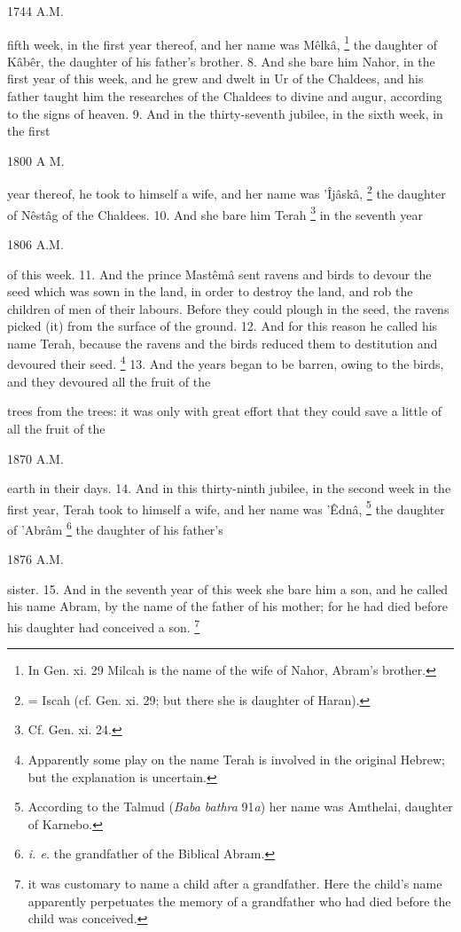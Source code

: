 1744 A.M.

fifth week, in the first year thereof, and her name was Mêlkâ, \footnote{In Gen. xi. 29 Milcah is the name of the wife of Nahor, Abram's brother.} the daughter of Kâbêr, the daughter of his father's brother. 8. And she bare him Nahor, in the first year of this week, and he grew and dwelt in Ur of the Chaldees, and his father taught him the researches of the Chaldees to divine and augur, according to the signs of heaven. 9. And in the thirty-seventh jubilee, in the sixth week, in the first

1800 A M.

year thereof, he took to himself a wife, and her name was ’Îjâskâ, \footnote{= Iscah (cf. Gen. xi. 29; but there she is daughter of Haran).} the daughter of Nêstâg of the Chaldees. 10. And she bare him Terah \footnote{Cf. Gen. xi. 24.} in the seventh year

1806 A.M.

of this week. 11. And the prince Mastêmâ sent ravens and birds to devour the seed which was sown in the land, in order to destroy the land, and rob the children of men of their labours. Before they could plough in the seed, the ravens picked (it) from the surface of the ground. 12. And for this reason he called his name Terah, because the ravens and the birds reduced them to destitution and devoured their seed. \footnote{Apparently some play on the name Terah is involved in the original Hebrew; but the explanation is uncertain.} 13. And the years began to be barren, owing to the birds, and they devoured all the fruit of the

trees from the trees: it was only with great effort that they could save a little of all the fruit of the

1870 A.M.

earth in their days. 14. And in this thirty-ninth jubilee, in the second week in the first year, Terah took to himself a wife, and her name was ’Êdnâ, \footnote{According to the Talmud (\emph{Baba bathra} 91\emph{a}) her name was Amthelai, daughter of Karnebo.} the daughter of ’Abrâm \footnote{\emph{i. e.} the grandfather of the Biblical Abram.} the daughter of his father's

1876 A.M.

sister. 15. And in the seventh year of this week she bare him a son, and he called his name Abram, by the name of the father of his mother; for he had died before his daughter had conceived a son. \footnote{it was customary to name a child after a grandfather. Here the child's name apparently perpetuates the memory of a grandfather who had died before the child was conceived.}

